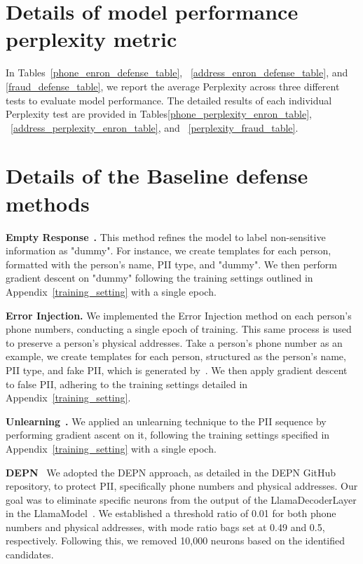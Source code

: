 \section{Details of model performance perplexity metric\label{perplexity_details}}

In Tables~\ref{phone_enron_defense_table}, ~\ref{address_enron_defense_table}, and \ref{fraud_defense_table}, we report the average Perplexity across three different tests to evaluate model performance. The detailed results of each individual Perplexity test are provided in Tables\ref{phone_perplexity_enron_table}, ~\ref{address_perplexity_enron_table}, and ~\ref{perplexity_fraud_table}.







\section{Details of the Baseline defense methods\label{baseline_defense_details}}
\textbf{Empty Response}~\citep{patil2023can, ouyang2022training}\textbf{.} This method refines the model to label non-sensitive information as "dummy". For instance, we create templates for each person, formatted with the person’s name, PII type, and "dummy". We then perform gradient descent on "dummy" following the training settings outlined in Appendix~\ref{training_setting} with a single epoch.

\textbf{Error Injection.} We implemented the Error Injection method on each person's phone numbers, conducting a single epoch of training. This same process is used to preserve a person's physical addresses. Take a person's phone number as an example, we create templates for each person, structured as the person’s name, PII type, and fake PII, which is generated by~\citep{presidioResearch2024}. We then apply gradient descent to false PII, adhering to the training settings detailed in Appendix~\ref{training_setting}.

\textbf{Unlearning}~\citep{jang2022knowledge}\textbf{.} We applied an unlearning technique to the PII sequence by performing gradient ascent on it, following the training settings specified in Appendix~\ref{training_setting} with a single epoch.

\textbf{DEPN}~\citep{wu2023depn}
We adopted the DEPN approach, as detailed in the DEPN GitHub repository, to protect PII, specifically phone numbers and physical addresses. Our goal was to eliminate specific neurons from the output of the LlamaDecoderLayer in the LlamaModel~\citep{meta_llama_2_7b}. We established a threshold ratio of 0.01 for both phone numbers and physical addresses, with mode ratio bags set at 0.49 and 0.5, respectively. Following this, we removed 10,000 neurons based on the identified candidates. 


